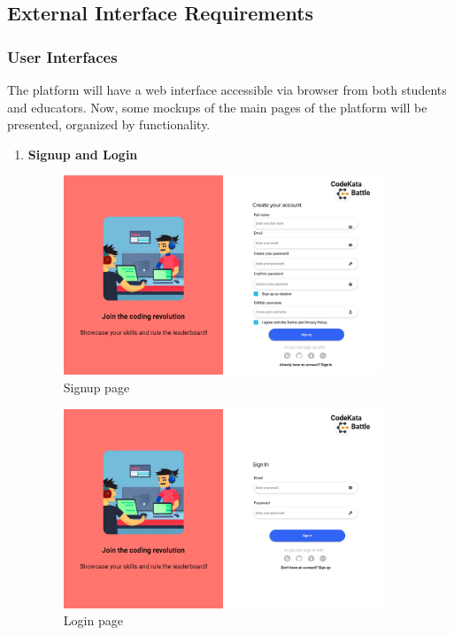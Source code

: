 \subsection{External Interface Requirements}
\subsubsection{User Interfaces}
The platform will have a web interface accessible via browser from both students and educators. 
Now, some mockups of the main pages of the platform will be presented, organized by functionality.

\begin{enumerate}[label=\textbf{F\arabic*)}]
    \item \textbf{Signup and Login}\\
    \begin{figure}[H]
        \centering
        \includegraphics[width=0.9\textwidth]{Mockups/1_signup.png}
        \caption{Signup page}
    \end{figure}
    \begin{figure}[H]
        \centering
        \includegraphics[width=0.9\textwidth]{Mockups/2_login.png}
        \caption{Login page}
    \end{figure}


\end{enumerate}
